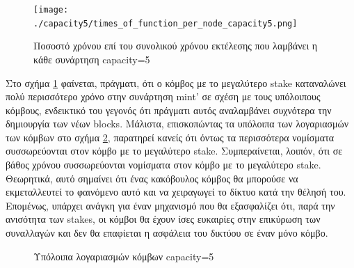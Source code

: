 \documentclass{article}
\newcommand{\eng}[1]{\foreignlanguage{english}{#1}} %
\begin{document}
\begin{figure}[ht]
    \centering
    \texttt{[image: ./capacity5/times\_of\_function\_per\_node\_capacity5.png]}
    \caption{Ποσοστό χρόνου επί του συνολικού χρόνου εκτέλεσης που λαμβάνει η κάθε συνάρτηση \eng{capacity=5}}
    \label{fig:fairness-funcs}
\end{figure}
\FloatBarrier

Στο σχήμα \ref{fig:fairness-funcs} φαίνεται, πράγματι, ότι ο κόμβος με το
μεγαλύτερο \eng{stake} καταναλώνει πολύ περισσότερο χρόνο στην συνάρτηση
\eng{mint'} σε σχέση με τους υπόλοιπους κόμβους, ενδεικτικό του γεγονός ότι
πράγματι αυτός αναλαμβάνει συχνότερα την δημιουργία των νέων \eng{blocks}.
Μάλιστα, επισκοπώντας τα υπόλοιπα των λογαριασμών των κόμβων στο σχήμα
\ref{fig:fairness-balances}, παρατηρεί κανείς ότι όντως τα περισσότερα
νομίσματα συσσωρεύονται στον κόμβο με το μεγαλύτερο \eng{stake}. Συμπεραίνεται,
λοιπόν, ότι σε βάθος χρόνου συσσωρεύονται νομίσματα στον κόμβο με το μεγαλύτερο
\eng{stake}. Θεωρητικά, αυτό σημαίνει ότι ένας κακόβουλος κόμβος θα μπορούσε
να εκμεταλλευτεί το φαινόμενο αυτό και να χειραγωγεί το δίκτυο κατά την
θέλησή του. Επομένως, υπάρχει ανάγκη για έναν μηχανισμό που θα εξασφαλίζει
ότι, παρά την ανισότητα των \eng{stakes}, οι κόμβοι θα έχουν ίσες ευκαιρίες
στην επικύρωση των συναλλαγών και δεν θα επαφίεται η ασφάλεια του δικτύου
σε έναν μόνο κόμβο.

\begin{figure}[h]
    \centering    
    \begin{varwidth}{\linewidth}
        
    \end{varwidth}
    \caption{Υπόλοιπα λογαριασμών κόμβων \eng{capacity=5}}
    \label{fig:fairness-balances}
\end{figure}
\end{document}
